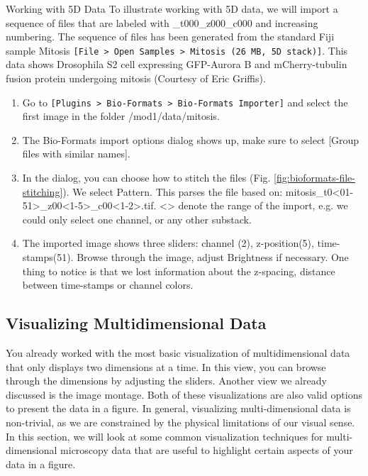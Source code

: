 \begin{taskbox}{Working with 5D Data}
To illustrate working with 5D data, we will import a sequence of files that are labeled with \_t000\_z000\_c000 and increasing numbering. The sequence of files has been generated from the standard Fiji sample Mitosis \texttt{[File > Open Samples > Mitosis (26 MB, 5D stack)]}. This data shows Drosophila S2 cell expressing GFP-Aurora B and mCherry-tubulin fusion protein undergoing mitosis (Courtesy of Eric Griffis).

\begin{enumerate}
	\item Go to \texttt{[Plugins > Bio-Formats > Bio-Formats Importer]} and select the first image in the folder /mod1/data/mitosis.
	\item The Bio-Formats import options dialog shows up, make sure to select [Group files with similar names].
	\item In the dialog, you can choose how to stitch the files (Fig. \ref{fig:bioformats-file-stitching}). We select Pattern. This parses the file based on: mitosis\_t0<01-51>\_z00<1-5>\_c00<1-2>.tif. <> denote the range of the import, e.g. we could only select one channel, or any other substack.
	
	\begin{minipage}[t]{\linewidth}
		\begin{center}
		\medskip
		\label{fig:bioformats-file-stitching}
		\end{center}
	\end{minipage}
	
	\item The imported image shows three sliders: channel (2), z-position(5), time-stamps(51). Browse through the image, adjust Brightness if necessary. One thing to notice is that we lost information about the z-spacing, distance between time-stamps or channel colors.
\end{enumerate}

\end{taskbox}

\subsection{Visualizing Multidimensional Data}
You already worked with the most basic visualization of multidimensional data that only displays two dimensions at a time. In this view, you can browse through the dimensions by adjusting the sliders. Another view we already discussed is the image montage. Both of these visualizations are also valid options to present the data in a figure. In general, visualizing multi-dimensional data is non-trivial, as we are constrained by the physical limitations of our visual sense. In this section, we will look at some common visualization techniques for multi-dimensional microscopy data that are useful to highlight certain aspects of your data in a figure.

